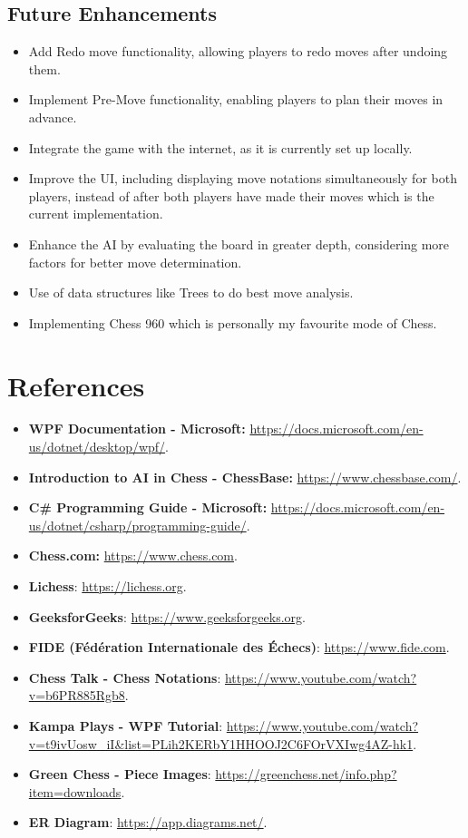 \documentclass[a4paper,12pt]{article}
\begin{document}
\subsection{Future Enhancements}
\begin{itemize}
    \item Add Redo move functionality, allowing players to redo moves after undoing them.
    \item Implement Pre-Move functionality, enabling players to plan their moves in advance.
    \item Integrate the game with the internet, as it is currently set up locally.
    \item Improve the UI, including displaying move notations simultaneously for both players, instead of after both players have made their moves which is the current implementation.
    \item Enhance the AI by evaluating the board in greater depth, considering more factors for better move determination.
    \item Use of data structures like Trees to do best move analysis.
    \item Implementing Chess 960 which is personally my favourite mode of Chess.
\end{itemize}

\section{References}
\begin{itemize}
    \item \textbf{WPF Documentation - Microsoft:} \url{https://docs.microsoft.com/en-us/dotnet/desktop/wpf/}.
    \item \textbf{Introduction to AI in Chess - ChessBase:} \url{https://www.chessbase.com/}.
    \item \textbf{C\# Programming Guide - Microsoft:} \url{https://docs.microsoft.com/en-us/dotnet/csharp/programming-guide/}.
    \item \textbf{Chess.com:} \url{https://www.chess.com}. 
    \item \textbf{Lichess}: \url{https://lichess.org}. 
    \item \textbf{GeeksforGeeks}: \url{https://www.geeksforgeeks.org}.
    \item \textbf{FIDE (Fédération Internationale des Échecs)}: \url{https://www.fide.com}.
    \item \textbf{Chess Talk - Chess Notations}: \url{https://www.youtube.com/watch?v=b6PR885Rgb8}. 
    \item \textbf{Kampa Plays - WPF Tutorial}: \url{https://www.youtube.com/watch?v=t9ivUosw_iI&list=PLih2KERbY1HHOOJ2C6FOrVXIwg4AZ-hk1}.
    \item \textbf{Green Chess - Piece Images}:  \url{https://greenchess.net/info.php?item=downloads}.
    \item \textbf{ER Diagram}:  \url{https://app.diagrams.net/}.
\end{itemize}
\end{document}
